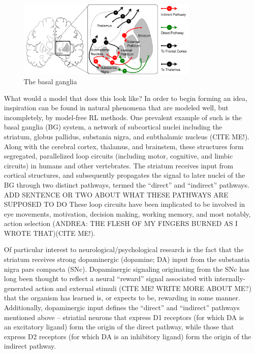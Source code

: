 \documentclass[10pt,letterpaper]{article}
\begin{document}
\begin{figure}[ht]
	\begin{center}
		\includegraphics[width=3.5in]{basal-ganglia.png}
	\end{center}
	\caption{The basal ganglia} 
	\label{pss}
\end{figure}

What would a model that does this look like? In order to begin forming an idea, inspiration can be found in natural phenomena that are modeled well, but incompletely, by model-free RL methods. One prevalent example of such is the basal ganglia (BG) system, a network of subcortical nuclei including the striatum, globus pallidus, substania nigra, and subthalamic nucleus (CITE ME!). Along with the cerebral cortex, thalamus, and brainstem, these structures form segregated, parallelized loop circuits (including motor, cognitive, and limbic circuits) in humans and other vertebrates. The striatum receives input from cortical structures, and subsequently propagates the signal to later nuclei of the BG through two distinct pathways, termed the “direct” and “indirect” pathways. ADD SENTENCE OR TWO ABOUT WHAT THESE PATHWAYS ARE SUPPOSED TO DO These loop circuits have been implicated to be involved in eye movements, motivation, decision making, working memory, and most notably, action selection (ANDREA: THE FLESH OF MY FINGERS BURNED AS I WROTE THAT)(CITE ME!). 


	
Of particular interest to neurological/psychological research is the fact that the striatum receives strong dopaminergic (dopamine; DA) input from the substantia nigra pars compacta (SNc). Dopaminergic signaling originating from the SNc has long been thought to reflect a neural “reward” signal associated with internally-generated action and external stimuli (CITE ME! WRITE MORE ABOUT ME?) that the organism has learned is, or expects to be, rewarding in some manner. Additionally, dopaminergic input defines the “direct” and “indirect” pathways mentioned above – striatial neurons that express D1 receptors (for which DA is an excitatory ligand) form the origin of the direct pathway, while those that express D2 receptors (for which DA is an inhibitory ligand) form the origin of the indirect pathway.
\end{document}
